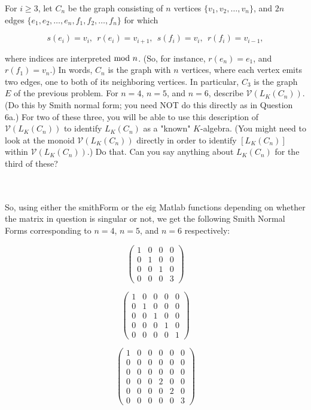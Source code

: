 For $i\geq 3$, let $C_n$ be the graph consisting of $n$ vertices $\{v_1, v_2, \hdots, v_n\}$,  and $2n$
edges $\{e_1, e_2, \hdots, e_n, f_1, f_2, \hdots, f_n\}$ for which 

$$s(e_i) = v_i,  \ \  r(e_i) = v_{i+1}, \ \  s(f_i) = v_i,  \ \ r(f_i) = v_{i-1},$$

where indices are interpreted ${\rm mod } \ n$. (So, for instance, $r(e_n) = e_1$, and $r(f_1) = v_n$.)
In words, $C_n$ is the graph with $n$ vertices, where each vertex emits two edges, one to both of its
neighboring vertices. In particular, $C_3$ is the graph $E$ of the previous problem. For $n=4$, $n=5$,
and $n=6$, describe $\mathcal{V}(L_K(C_n))$. (Do this by Smith normal form; you need NOT do this
directly as in Question 6a.) For two of these three, you will be able to use this description of
$\mathcal{V}(L_K(C_n))$ to identify $L_K(C_n)$ as a "known" $K$-algebra. (You might need to look at the
monoid $\mathcal{V}(L_K(C_n))$ directly in order to identify $[  L_K(C_n) ]$ within 
$\mathcal{V}(L_K(C_n))$.) Do that. Can you say anything about $L_K(C_n)$ for the third of these?\\\\ 

\begin{solution}\renewcommand{\qedsymbol}{}\ \\
    So, using either the smithForm or the eig Matlab functions depending on whether the matrix in
    question is singular or not, we get the following Smith Normal Forms corresponding to $n=4$, $n=5$,
    and $n=6$ respectively:

    $$\left(\begin{array}{cccc} 1 & 0 & 0 & 0 \\ 0 & 1 & 0 & 0 \\ 
                                0 & 0 & 1 & 0 \\ 0 & 0 & 0 & 3 \end{array}\right)$$

    $$\left(\begin{array}{ccccc} 1 & 0 & 0 & 0 & 0 \\ 0 & 1 & 0 & 0 & 0 \\ 0 & 0 & 1 & 0 & 0 \\ 
                                 0 & 0 & 0 & 1 & 0 \\ 0 & 0 & 0 & 0 & 1 \end{array}\right)$$

    $$\left(\begin{array}{cccccc} 1 & 0 & 0 & 0 & 0 & 0 \\ 0 & 0 & 0 & 0 & 0 & 0 \\
                                  0 & 0 & 0 & 0 & 0 & 0 \\ 0 & 0 & 0 & 2 & 0 & 0 \\
                                  0 & 0 & 0 & 0 & 2 & 0 \\ 0 & 0 & 0 & 0 & 0 & 3 \end{array}\right)$$
\end{solution}

\newpage

\newpage